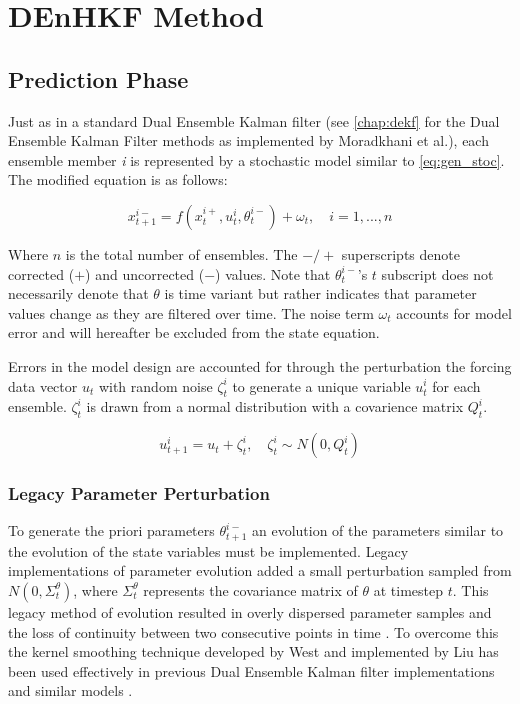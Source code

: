 \section{DEnHKF Method}

\subsection{Prediction Phase}

Just as in a standard Dual Ensemble Kalman filter (see \autoref{chap:dekf} for the Dual Ensemble Kalman Filter methods as implemented by Moradkhani et al.), each ensemble member \textit{i} is represented by a stochastic model similar to \eqref{eq:gen_stoc}. The modified equation is as follows:

\begin{equation}\label{eq:hdekf_predict}
x_{t+1}^{i-} = f(x_{t}^{i+}, u_{t}^{i}, \theta^{i-}_{t}) + \omega_{t}, \quad i=1,...,n
\end{equation}

Where $n$ is the total number of ensembles. The $-/+$ superscripts denote corrected ($+$) and uncorrected ($-$) values. Note that $\theta^{i-}_{t}$'s $t$ subscript does not necessarily denote that $\theta$ is time variant but rather indicates that parameter values change as they are filtered over time. The noise term $\omega_{t}$ accounts for model error and will hereafter be excluded from the state equation.

Errors in the model design are accounted for through the perturbation the forcing data vector $u_{t}$ with random noise $\zeta_{t}^{i}$ to generate a unique variable $u_{t}^{i}$ for each ensemble. $\zeta_{t}^{i}$ is drawn from a normal distribution with a covarience matrix $Q_{t}^{i}$.

\begin{equation}\label{eq:hdekf_u}
u_{t+1}^{i} = u_{t} + \zeta_{t}^{i}, \quad \zeta_{t}^{i} \sim N(0,Q_{t}^{i}) 
\end{equation}

\subsubsection{Legacy Parameter Perturbation}

To generate the priori parameters $\theta^{i-}_{t+1}$ an evolution of the parameters similar to the evolution of the state variables must be implemented. Legacy implementations of parameter evolution added a small perturbation sampled from $N(0,\Sigma^{\theta}_{t})$, where $\Sigma^{\theta}_{t}$ represents the covariance matrix of $\theta$ at timestep $t$. This legacy method of evolution resulted in overly dispersed parameter samples and the loss of continuity between two consecutive points in time \cite{Liu2000} \cite{Chen2008}. To overcome this the kernel smoothing technique developed by West \cite{West1993} and implemented by Liu \cite{Liu2000} has been used effectively in previous Dual Ensemble Kalman filter implementations \cite{Moradkhani2005} and similar models \cite{Chen2008}.

